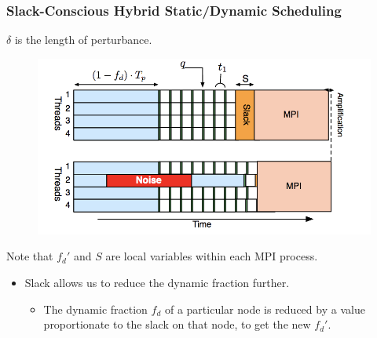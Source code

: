 {\begin{frame}[label=slackfs]
\frametitle{Slack-Conscious Hybrid Static/Dynamic Scheduling}
\begin{center}
{\small $\delta$ is the length of perturbance.} 
\end{center}
\begin{figure}
  \begin{center}
    \includegraphics[scale=0.41]{./images/slackConsciousSched}
  \end{center}
\end{figure}
\begin{center}
\end{center}
\begin{center}
{\tiny Note that $f_d'$ and $S$ are local variables within each MPI process.}
\end{center}


\begin{itemize}
\small \item \small Slack allows us to reduce the dynamic fraction
further. 
\begin{itemize}
\tiny \item \tiny The dynamic fraction $f_d$ of a particular node is reduced by a value proportionate to the slack on that node, to get the new $f_d'$.
\end{itemize}
\end{itemize}
\end{frame}

}
